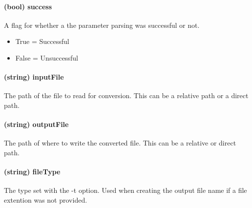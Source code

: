         \paragraph{(bool) success}
            A flag for whether a the parameter parsing was successful or not.
            \begin{itemize}
                \item True = Successful
                \item False = Unsuccessful
            \end{itemize}

        \paragraph{(string) inputFile}
            The path of the file to read for conversion.  This can be a relative path or a direct path.
        
        \paragraph{(string) outputFile}
            The path of where to write the converted file.  This can be a relative or direct path.
        
        \paragraph{(string) fileType}
            The type set with the -t option.  Used when creating the output file name if a file extention was not provided.
            